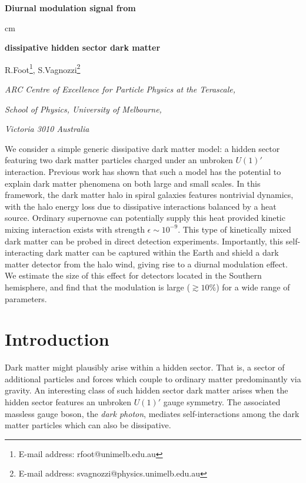 \documentclass[12pt]{article}
\begin{document}

\renewcommand{\arraystretch}{2}

\begin{titlepage}
\vskip 2cm
\centerline{\Large \bf
Diurnal modulation signal from}  cm
\centerline{\Large \bf dissipative hidden sector dark matter}

\vskip 2.2cm
\centerline{\large R.Foot\footnote{E-mail address: rfoot@unimelb.edu.au}, S.Vagnozzi\footnote{
E-mail address: svagnozzi@physics.unimelb.edu.au}}


\vskip 0.7cm
\centerline{\it ARC Centre of Excellence for Particle Physics at the Terascale,}
\centerline{\it School of Physics, University of Melbourne,}
\centerline{\it Victoria 3010 Australia}
\vskip 2cm
\noindent

We consider a simple generic dissipative dark matter model: a hidden sector featuring two dark matter particles charged under an unbroken $U(1)'$ interaction. Previous work has shown that such a model has the potential to explain dark matter phenomena on both large and small scales. In this framework, the dark matter halo in spiral galaxies features nontrivial dynamics, with the halo energy loss due to dissipative interactions balanced by a heat source. Ordinary supernovae can potentially supply this heat provided kinetic mixing interaction exists with strength $\epsilon \sim 10 ^{-9}$. This type of kinetically mixed dark matter can be probed in direct detection experiments. Importantly, this self-interacting dark matter can be captured within the Earth and shield a dark matter detector from the halo wind, giving rise to a diurnal modulation effect. We estimate the size of this effect for detectors located in the Southern hemisphere, and find that the modulation is large ($\gtrsim 10\%$) for a wide range of parameters.

 \end{titlepage}
 
 \newpage

\section{Introduction}

Dark matter might plausibly arise within a hidden sector. That is, a sector of additional particles and forces which couple to ordinary matter predominantly via gravity. An interesting class of such hidden sector dark matter arises when the hidden sector features an unbroken $U(1)'$ gauge symmetry. The associated massless gauge boson, the \textit{dark photon}, mediates self-interactions among the dark matter particles which can also be dissipative.
\end{document}
